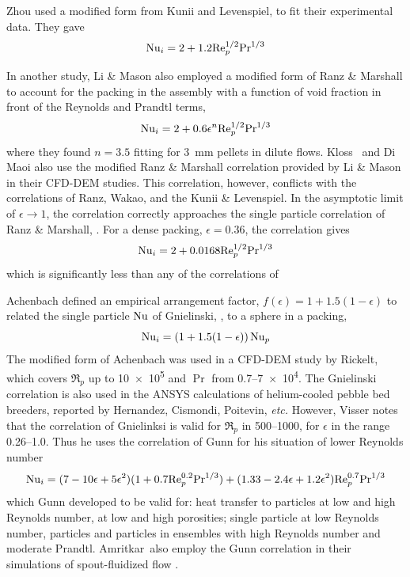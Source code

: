 Zhou\etal\cite{Zhou2009} used a modified form from Kunii and Levenspiel, to fit their experimental data. They gave
\begin{equation}\label{eq:kunii}
    \mathrm{Nu}_i = 2 + 1.2\mathrm{Re}_p^{1/2}\mathrm{Pr}^{1/3}
\end{equation}

In another study, Li \& Mason\cite{Li2000} also employed a modified form of Ranz \& Marshall to account for the packing in the assembly with a function of void fraction in front of the Reynolds and Prandtl terms,
\begin{equation}\label{eq:modified-ranz}
    \mathrm{Nu}_i = 2+ 0.6\epsilon^n\mathrm{Re}_p^{1/2}\mathrm{Pr}^{1/3}
\end{equation}
where they found $n= 3.5$ fitting for \SI{3}{\milli\meter} pellets in dilute flows\cite{Li2000}. Kloss\etal~\cite{Kloss2012} and Di Maoi\etal\cite{DiMaio2009} also use the modified Ranz \& Marshall correlation provided by Li \& Mason in their CFD-DEM studies. This correlation, however, conflicts with the correlations of Ranz, Wakao, and the Kunii \& Levenspiel. In the asymptotic limit of $\epsilon \rightarrow 1$, the correlation correctly approaches the single particle correlation of Ranz \& Marshall, . For a dense packing, $\epsilon = 0.36$, the correlation gives
\begin{equation}
    \mathrm{Nu}_i = 2+ 0.0168\mathrm{Re}_p^{1/2}\mathrm{Pr}^{1/3}
\end{equation}
which is significantly less than any of the correlations of 


Achenbach defined an empirical arrangement factor, $f(\epsilon) = 1+1.5(1-\epsilon)$ to related the single particle $\mathrm{Nu}$ of Gnielinski, , to a sphere in a packing,
\begin{equation}\label{eq:modified-gnielinski}
    \mathrm{Nu}_i = \left(1 + 1.5(1-\epsilon)\right)\mathrm{Nu}_p
\end{equation}
The modified form of Achenbach was used in a CFD-DEM study by Rickelt\etal \cite{Rickelt2013}, which covers $\Re_p$ up to \num{10e5} and $\Pr$ from \numrange{0.7}{7e4}. The Gnielinski correlation\cite{gnielinski1982berechnung} is also used in the ANSYS calculations of helium-cooled pebble bed breeders, reported by Hernandez\etal\cite{Hernandez2013}, Cismondi\etal\cite{Cismondi2009}, Poitevin\etal\cite{Poitevin2010}, \textit{etc.} However, Visser notes \cite{Visser2007} that the correlation of Gnielinksi is valid for $\Re_p$ in \numrange{500}{1000}, for $\epsilon$ in the range \numrange{0.26}{1.0}. Thus he uses the correlation of Gunn for his situation of lower Reynolds number\cite{Gunn1978}
\begin{equation}\label{eq:gunn}
    \mathrm{Nu}_i = (7-10\epsilon+5\epsilon^2)(1+0.7\mathrm{Re}_p^{0.2}\mathrm{Pr}^{1/3})+(1.33-2.4\epsilon+1.2\epsilon^2)\mathrm{Re}_p^{0.7}\mathrm{Pr}^{1/3}
\end{equation}
which Gunn developed to be valid for: heat transfer to particles at low and high Reynolds number, at low and high porosities; single particle at low Reynolds number, particles and particles in ensembles with high Reynolds number and moderate Prandtl. Amritkar\etal~also employ the Gunn correlation in their simulations of spout-fluidized flow \cite{Amritkar2014}.

